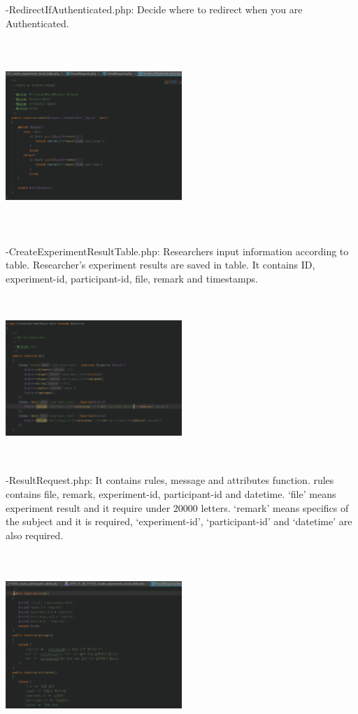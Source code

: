\documentclass[letterpaper, 10 pt, conference]{ieeeconf}  %
\begin{document}
-RedirectIfAuthenticated.php: Decide where to redirect when you are Authenticated.
\begin{center}
\includegraphics[width=0.5\textwidth,height = 7.25cm]{class/4.png}
\end{center}

-CreateExperimentResultTable.php: Researchers input information according to table. Researcher’s experiment results are saved in table. It contains ID, experiment-id, participant-id, file, remark and timestamps. 
\begin{center}
\includegraphics[width=0.5\textwidth,height = 6.25cm]{class/5.png}
\end{center}

-ResultRequest.php: It contains rules, message and attributes function. rules contains file, remark, experiment-id, participant-id and datetime. ‘file’ means experiment result and it require under 20000 letters. ‘remark’ means specifics of the subject and it is required, ‘experiment-id’, ‘participant-id’ and ‘datetime’ are also required.
\begin{center}
\includegraphics[width=0.5\textwidth,height = 7cm]{class/6.png}
\end{center}
\end{document}
